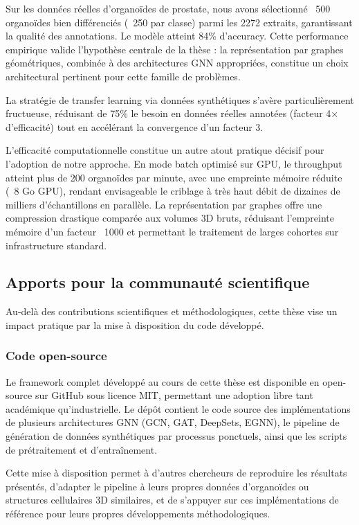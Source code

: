 Sur les données réelles d'organoïdes de prostate, nous avons sélectionné ~500 organoïdes bien différenciés (~250 par classe) parmi les 2272 extraits, garantissant la qualité des annotations. Le modèle atteint 84\% d'accuracy. Cette performance empirique valide l'hypothèse centrale de la thèse : la représentation par graphes géométriques, combinée à des architectures GNN appropriées, constitue un choix architectural pertinent pour cette famille de problèmes.

La stratégie de transfer learning via données synthétiques s'avère particulièrement fructueuse, réduisant de 75\% le besoin en données réelles annotées (facteur 4× d'efficacité) tout en accélérant la convergence d'un facteur 3.

L'efficacité computationnelle constitue un autre atout pratique décisif pour l'adoption de notre approche. En mode batch optimisé sur GPU, le throughput atteint plus de 200 organoïdes par minute, avec une empreinte mémoire réduite (~8 Go GPU), rendant envisageable le criblage à très haut débit de dizaines de milliers d'échantillons en parallèle. La représentation par graphes offre une compression drastique comparée aux volumes 3D bruts, réduisant l'empreinte mémoire d'un facteur ~1000 et permettant le traitement de larges cohortes sur infrastructure standard.

\subsection{Apports pour la communauté scientifique}

Au-delà des contributions scientifiques et méthodologiques, cette thèse vise un impact pratique par la mise à disposition du code développé.

\subsubsection{Code open-source}

Le framework complet développé au cours de cette thèse est disponible en open-source sur GitHub sous licence MIT, permettant une adoption libre tant académique qu'industrielle. Le dépôt contient le code source des implémentations de plusieurs architectures GNN (GCN, GAT, DeepSets, EGNN), le pipeline de génération de données synthétiques par processus ponctuels, ainsi que les scripts de prétraitement et d'entraînement.

Cette mise à disposition permet à d'autres chercheurs de reproduire les résultats présentés, d'adapter le pipeline à leurs propres données d'organoïdes ou structures cellulaires 3D similaires, et de s'appuyer sur ces implémentations de référence pour leurs propres développements méthodologiques.


